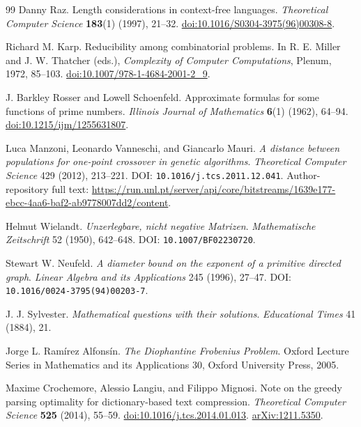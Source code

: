 \documentclass[11pt,letterpaper]{article}
\theoremstyle{definition}
\theoremstyle{remark}
\begin{document}
\begin{thebibliography}{99}
Danny Raz.
Length considerations in context-free languages.
\emph{Theoretical Computer Science} \textbf{183}(1) (1997), 21--32.
\href{https://doi.org/10.1016/S0304-3975(96)00308-8}{doi:10.1016/S0304-3975(96)00308-8}.

Richard M. Karp.
Reducibility among combinatorial problems.
In R. E. Miller and J. W. Thatcher (eds.),
\emph{Complexity of Computer Computations}, Plenum, 1972, 85--103.
\href{https://doi.org/10.1007/978-1-4684-2001-2_9}{doi:10.1007/978-1-4684-2001-2\_9}.

J. Barkley Rosser and Lowell Schoenfeld.
Approximate formulas for some functions of prime numbers.
\emph{Illinois Journal of Mathematics} \textbf{6}(1) (1962), 64--94.
\href{https://doi.org/10.1215/ijm/1255631807}{doi:10.1215/ijm/1255631807}.

Luca Manzoni, Leonardo Vanneschi, and Giancarlo Mauri.
\emph{A distance between populations for one-point crossover in genetic algorithms}.
\emph{Theoretical Computer Science} 429 (2012), 213--221.
DOI: \nolinkurl{10.1016/j.tcs.2011.12.041}.
Author-repository full text:
\url{https://run.unl.pt/server/api/core/bitstreams/1639e177-ebcc-4aa6-baf2-ab9778007dd2/content}.

Helmut Wielandt.
\emph{Unzerlegbare, nicht negative Matrizen}.
\emph{Mathematische Zeitschrift} 52 (1950), 642--648.
DOI: \nolinkurl{10.1007/BF02230720}.

Stewart W. Neufeld.
\emph{A diameter bound on the exponent of a primitive directed graph}.
\emph{Linear Algebra and its Applications} 245 (1996), 27--47.
DOI: \nolinkurl{10.1016/0024-3795(94)00203-7}.

J. J. Sylvester.
\emph{Mathematical questions with their solutions}.
\emph{Educational Times} 41 (1884), 21.

Jorge L. Ram\'irez Alfons\'in.
\emph{The Diophantine Frobenius Problem}.
Oxford Lecture Series in Mathematics and its Applications 30,
Oxford University Press, 2005.

Maxime Crochemore, Alessio Langiu, and Filippo Mignosi.
Note on the greedy parsing optimality for dictionary-based text compression.
\emph{Theoretical Computer Science} \textbf{525} (2014), 55--59.
\href{https://doi.org/10.1016/j.tcs.2014.01.013}{doi:10.1016/j.tcs.2014.01.013}.
\href{https://arxiv.org/abs/1211.5350}{arXiv:1211.5350}.


\end{thebibliography}
\end{document}
